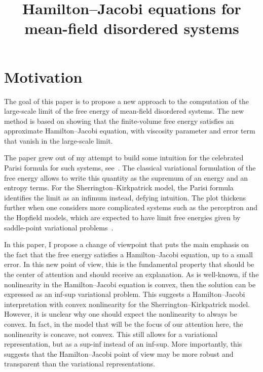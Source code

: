 \documentclass[AHL,Unicode,longabstracts,published]{cedram}
\title[Hamilton--Jacobi equations for mean-field disordered systems]{Hamilton--Jacobi equations for mean-field disordered systems}
\author[\initial{J.-C.} \lastname{Mourrat}]{\firstname{Jean-Christophe} \lastname{Mourrat}}
\newcommand{\1}{\mathds{1}}
\begin{document}
\maketitle


\section{Motivation}

The goal of this paper is to propose a new approach to the computation of the large-scale limit of the free energy of mean-field disordered systems. The new method is based on showing that the finite-volume free energy satisfies an approximate Hamilton--Jacobi equation, with viscosity parameter and error term that vanish in the large-scale limit.


The paper grew out of my attempt to build some intuition for the celebrated Parisi formula for such systems, see~\cite{guerra,MPV,pan,Tpaper,Tbook2}. The classical variational formulation of the free energy allows to write this quantity as the supremum of an energy and an entropy terms. For the Sherrington--Kirkpatrick model, the Parisi formula identifies the limit as an infimum instead, defying intuition. The plot thickens further when one considers more complicated systems such as the perceptron and the Hopfield models, which are expected to have limit free energies given by saddle-point variational problems~\cite{obnoxious}.


In this paper, I propose a change of viewpoint that puts the main emphasis on the fact that the free energy satisfies a Hamilton--Jacobi equation, up to a small error. In this new point of view, this is the fundamental property that should be the center of attention and should receive an explanation. As is well-known, if the nonlinearity in the Hamilton--Jacobi equation is convex, then the solution can be expressed as an inf-sup variational problem. This suggests a Hamilton--Jacobi interpretation with convex nonlinearity for the Sherrington--Kirkpatrick model. However, it is unclear why one should expect the nonlinearity to always be convex. In fact, in the model that will be the focus of our attention here, the nonlinearity is concave, not convex. This still allows for a variational representation, but as a sup-inf instead of an inf-sup. More importantly, this suggests that the Hamilton--Jacobi point of view may be more robust and transparent than the variational representations.
\end{document}
